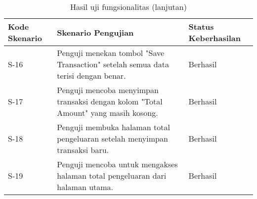 \begin{table}[h!]
\ContinuedFloat
\caption{Hasil uji fungsionalitas (lanjutan)}
\begin{tabularx}{\linewidth}{|p{2cm}|X|p{2.5cm}|}
\hline
\textbf{Kode Skenario} & \textbf{Skenario Pengujian} & \textbf{Status Keberhasilan} \\
\hline
S-16 & Penguji menekan tombol "Save Transaction" setelah semua data terisi dengan benar. & Berhasil \\
\hline
S-17 & Penguji mencoba menyimpan transaksi dengan kolom "Total Amount" yang masih kosong. & Berhasil \\
\hline
S-18 & Penguji membuka halaman total pengeluaran setelah menyimpan transaksi baru. & Berhasil \\
\hline
S-19 & Penguji mencoba untuk mengakses halaman total pengeluaran dari halaman utama. & Berhasil \\
\hline
\end{tabularx}
\end{table}